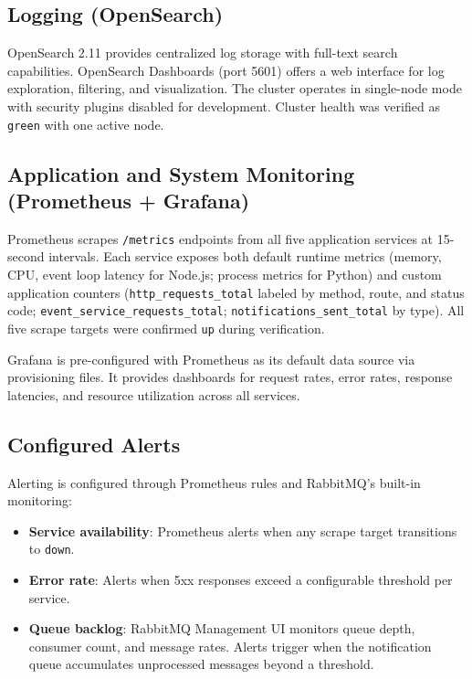 \documentclass[12pt,a4paper]{article}
\begin{document}
\subsection{Logging (OpenSearch)}

OpenSearch 2.11 provides centralized log storage with full-text search capabilities. OpenSearch Dashboards (port 5601) offers a web interface for log exploration, filtering, and visualization. The cluster operates in single-node mode with security plugins disabled for development. Cluster health was verified as \texttt{green} with one active node.

\subsection{Application and System Monitoring (Prometheus + Grafana)}

Prometheus scrapes \texttt{/metrics} endpoints from all five application services at 15-second intervals. Each service exposes both default runtime metrics (memory, CPU, event loop latency for Node.js; process metrics for Python) and custom application counters (\texttt{http\_requests\_total} labeled by method, route, and status code; \texttt{event\_service\_requests\_total}; \texttt{notifications\_sent\_total} by type). All five scrape targets were confirmed \texttt{up} during verification.

Grafana is pre-configured with Prometheus as its default data source via provisioning files. It provides dashboards for request rates, error rates, response latencies, and resource utilization across all services.

\subsection{Configured Alerts}

Alerting is configured through Prometheus rules and RabbitMQ's built-in monitoring:
\begin{itemize}
    \item \textbf{Service availability}: Prometheus alerts when any scrape target transitions to \texttt{down}.
    \item \textbf{Error rate}: Alerts when 5xx responses exceed a configurable threshold per service.
    \item \textbf{Queue backlog}: RabbitMQ Management UI monitors queue depth, consumer count, and message rates. Alerts trigger when the notification queue accumulates unprocessed messages beyond a threshold.
\end{itemize}
\end{document}

